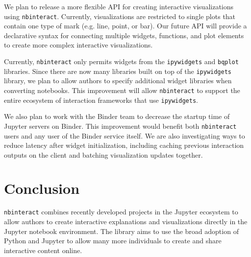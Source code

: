 \documentclass[nobib]{tufte-handout}
\newcommand{\code}[1]{\texttt{#1}}
\begin{document}
We plan to release a more flexible API for creating interactive visualizations
using \code{nbinteract}. Currently, visualizations are restricted to single
plots that contain one type of mark (e.g. line, point, or bar). Our future API
will provide a declarative syntax for connecting multiple widgets, functions,
and plot elements to create more complex interactive visualizations.

Currently, \code{nbinteract} only permits widgets from the \code{ipywidgets}
and \code{bqplot} libraries. Since there are now many libraries built on top of
the \code{ipywidgets} library, we plan to allow authors to
specify additional widget libraries when converting notebooks. This improvement
will allow \code{nbinteract} to support the entire ecosystem of interaction
frameworks that use \code{ipywidgets}.

We also plan to work with the Binder team to decrease the startup time of
Jupyter servers on Binder. This improvement would benefit both
\code{nbinteract} users and any user of the Binder service itself. We are also
investigating ways to reduce latency after widget initialization, including
caching previous interaction outputs on the client and batching visualization
updates together.



\section{Conclusion} %
\label{sec:conclusion}

\code{nbinteract} combines recently developed projects in the Jupyter ecosystem
to allow authors to create interactive explanations and visualizations directly
in the Jupyter notebook environment. The library aims to use the broad adoption
of Python and Jupyter to allow many more individuals to create and share
interactive content online.


\newpage

\printbibliography
\end{document}
